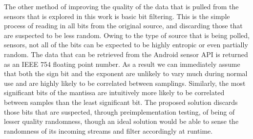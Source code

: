 The other method of improving the quality of the data that is pulled from the
sensors that is explored in this work is basic bit filtering. This is the simple
process of reading in all bits from the original source, and discarding those
that are suspected to be less random. Owing to the type of source that is being
polled, sensors, not all of the bits can be expected to be highly entropic or
even partially random. The data that can be retrieved from the Android sensor
API is returned as an IEEE 754 floating point number. As a result we can
immediately assume that both the sign bit and the exponent are unlikely to vary
much during normal use and are highly likely to be correlated between samplings.
Similarly, the most significant bits of the mantissa are intuitively more likely
to be correlated between samples than the least significant bit. The proposed
solution discards those bits that are suspected, through preimplementation
testing, of being of lesser quality randomness, though an ideal solution would
be able to sense the randomness of its incoming streams and filter accordingly
at runtime.
